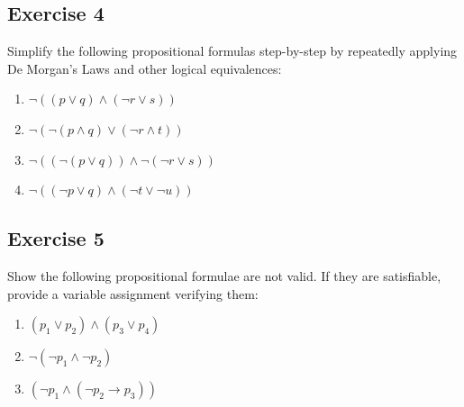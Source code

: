 \documentclass[11pt]{article}
\begin{document}
    \subsection*{Exercise 4}

    Simplify the following propositional formulas step-by-step by repeatedly applying De Morgan's Laws and other logical equivalences:

    \begin{enumerate}
        \item $\neg ((p \vee q) \wedge (\neg r \vee s))$

        \item $\neg (\neg(p \wedge q) \vee (\neg r \wedge t))$

        \item $\neg ((\neg(p \vee q)) \wedge \neg(\neg r \vee s))$

        \item $\neg ((\neg p \vee q) \wedge (\neg t \vee \neg u))$
    \end{enumerate}

    \subsection*{Exercise 5}

    Show the following propositional formulae are not valid.
    If they are satisfiable, provide a variable assignment verifying them:

    \begin{enumerate}
        \item $(p_1 \vee p_2) \wedge (p_3 \vee p_4)$
        \item $\neg (\neg p_1 \wedge \neg p_2)$
        \item $(\neg p_1 \wedge (\neg p_2 \rightarrow p_3))$
    \end{enumerate}
\end{document}
